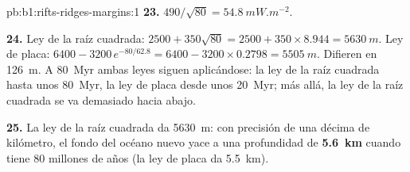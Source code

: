 \begin{solution}{pb:b1:rifts-ridges-margins:1}
\textbf{23.} $490/\sqrt{80} = \qty{54.8}{mW.m^{-2}}$.

\textbf{24.} Ley de la raíz cuadrada: $2500 + 350\sqrt{80} = 2500 + 350\times8.944 =
\qty{5630}{m}$. Ley de placa: $6400 - 3200\,e^{-80/62.8} = 6400 - 3200\times0.2798
= \qty{5505}{m}$. Difieren en \qty{126}{m}. A \qty{80}{Myr} ambas leyes siguen
aplicándose: la ley de la raíz cuadrada hasta unos \qty{80}{Myr}, la ley de placa desde
unos \qty{20}{Myr}; más allá, la ley de la raíz cuadrada se va demasiado hacia abajo.

\textbf{25.} La ley de la raíz cuadrada da \qty{5630}{m}: con precisión de una décima de kilómetro, el fondo del océano nuevo yace a una
profundidad de \textbf{\qty[text-series-to-math=true]{5.6}{km}} cuando tiene 80 millones de años (la ley de placa da \qty{5.5}{km}).
\end{solution}
